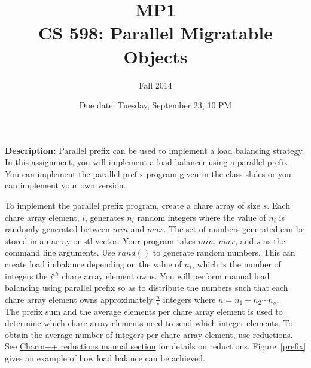 \documentclass{article}
\title{MP1 \\ CS 598: Parallel Migratable Objects}
\author{Fall 2014}
\date{Due date: Tuesday, September 23, 10 PM}
\begin{document}
\maketitle

\textbf{Description:} 
Parallel prefix can be used to implement a load balancing strategy. In this
assignment, you will implement a load balancer using a parallel prefix. You
can implement the parallel prefix program given in the class slides or you
can implement your own version. 


To implement the parallel prefix program, create a chare array of size $s$. Each
chare array element, $i$, generates $n_i$ random integers where the value of
$n_i$ is randomly generated between $min$ and $max$. The set of numbers generated
can be stored in an array or stl vector. Your program takes $min$,
$max$, and $s$ as the command line arguments. Use $rand()$ to generate random
numbers. This can create load imbalance depending on the value of $n_i$, which is
the number of integers the $i^{th}$ chare array element owns. You will perform manual load
balancing using parallel prefix so as to distribute the numbers such that each
chare array element owns approximately  $\frac{n}{s}$ integers where  $n = n_1 +
n_2 \cdots n_s$.\\



The prefix sum and the average elements per chare array element is used to
determine which chare array elements need to send which integer elements.  To
obtain the average number of integers per chare array element, use reductions.
See
\href{http://charm.cs.uiuc.edu/manuals/html/charm++/4.html#SECTION01361000000000000000}{Charm++
reductions manual section} for details on reductions. Figure~\ref{prefix} gives
an example of how load balance can be achieved. 
\end{document}

